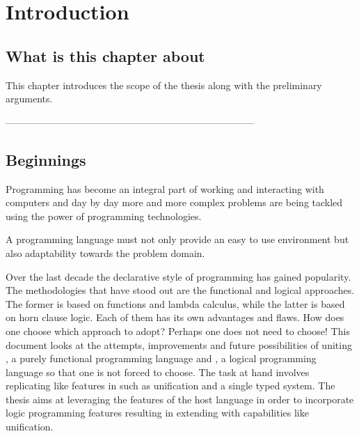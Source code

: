 \documentclass[thesis-solanki.tex]{subfiles}
\begin{document}
\chapter{Introduction}\label{chap:introduction}


\section{What is this chapter about}

This chapter introduces the scope of the thesis along with the preliminary arguments.


-----------------------------------------------------------------------------


\section{Beginnings}

Programming has become an integral part of working and interacting with computers and day by day more and more complex
problems are being tackled using the power of programming technologies.

A programming language must not only provide an easy to use environment but also adaptability towards the problem domain.

Over the last decade the declarative style of programming has gained popularity.
The methodologies that have stood out are the functional and logical approaches.
The former is based on functions and lambda calculus, while the latter is based on horn clause logic.
Each of them has its own advantages and ﬂaws.
How does one choose which approach to adopt?
Perhaps one does not need to choose!
This document looks at the attempts, improvements and future possibilities of uniting , a purely
functional programming language and , a logical programming language so that one is not forced to
choose. The task at hand involves replicating  like features in  such as unification and a single
typed system. The thesis aims at leveraging the features of the host language in order to incorporate logic programming features resulting in extending 
 with capabilities like unification. 
\end{document}
